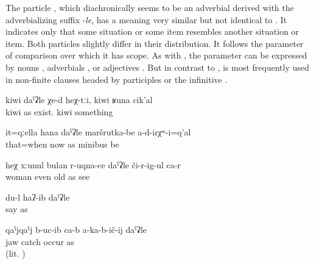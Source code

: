 The particle  , which diachronically seems to be an adverbial derived with the adverbializing suffix -\textit{le}, has a meaning very similar but not identical to . It indicates only that some situation or some item resembles another situation or item. Both particles slightly differ in their distribution. It follows the parameter of comparison over which it has scope. As with , the parameter can be expressed by nouns , adverbials , or adjectives . But in contrast to ,  is most frequently used in non-finite clauses headed by participles  or the infinitive . 
%
\begin{exe}
	\ex	\label{ex:‎This looks like kiwi, similar to kiwi or so}
	\gll	kiwi	daˁʡle	χe-d	heχ-tːi,	kiwi	ʁuna	cik'al\\
		kiwi	as	exist.		kiwi 	something\\
	\glt	{}

	\ex	\label{ex:At that (time) there were no minibuses like now}
	\gll	it=qːella	hana	daˁʡle	maršrutka-be	a-d-irχʷ-i=q'al\\
		that=when	now	as	minibus	be\\
	\glt	{}

	\ex	\label{ex:This woman looks even like old.}
	\gll	heχ	xːunul	bulan	r-uqna-ce	daˁʡle	či-r-ig-ul	ca-r\\
			woman	even	old	as	see	\\
	\glt	{} 

	\ex	\label{ex:as I said}
	\gll	du-l	haʔ-ib daˁʡle\\
			say	as\\
	\glt	{}
	
		\ex	\label{ex:He is keeping his jar as if it fell down}
	\gll	qaˁjqaˁj	b-uc-ib ca-b	a-ka-b-ič-ij	daˁʡle\\
		jaw	catch 	occur	as\\
	\glt	{} (lit. )
\end{exe}

